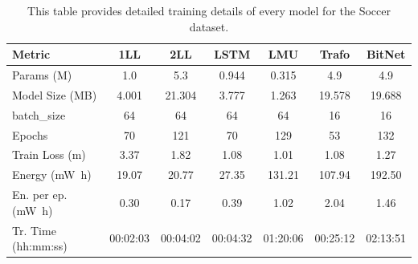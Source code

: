 \begin{table}[b]
    \centering
    \caption[Table of Training details for Soccer Dataset]{This table provides detailed training details of every model for the Soccer dataset.}    
    \begin{tabular}{l||c|c|c|c|c|c}
    \label{training_details_soccer}
    \textbf{Metric} & \textbf{1LL} & \textbf{2LL} & \textbf{LSTM} & \textbf{LMU} & \textbf{Trafo} & \textbf{BitNet} \\ \hline \hline
    Params (M) & 1.0 & 5.3 & 0.944 & 0.315 & 4.9 & 4.9 \\ \hline 
    Model Size (MB) & 4.001 & 21.304 & 3.777 & 1.263 & 19.578 & 19.688 \\ \hline 
    batch\_size & 64 & 64 & 64 & 64 & 16 & 16 \\ \hline 
    
    Epochs & 70 & 121 & 70 & 129 & 53 & 132 \\ \hline 
    Train Loss (\si{\meter})& 3.37 & 1.82 & 1.08 & 1.01 & 1.08 & 1.27 \\ \hline
    Energy (\si{\milli\watt\hour}) & 19.07 & 20.77 & 27.35 & 131.21 & 107.94 & 192.50 \\ \hline
    En. per ep. (\si{\milli\watt\hour}) & 0.30 & 0.17 & 0.39 & 1.02 & 2.04 & 1.46 \\ \hline
    Tr. Time (hh:mm:ss) & 00:02:03 & 00:04:02 & 00:04:32 & 01:20:06 & 00:25:12 & 02:13:51 \\ 
    \end{tabular}
\end{table}

